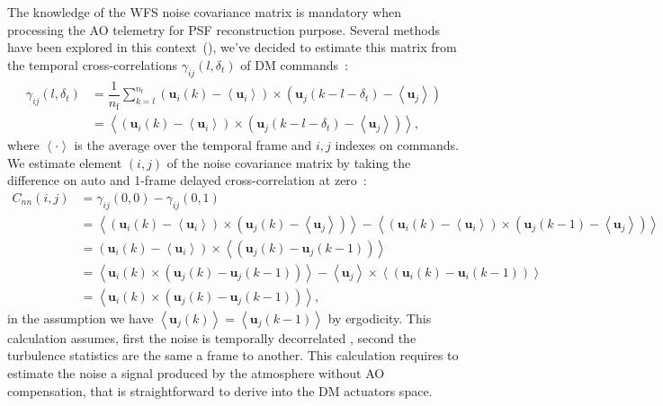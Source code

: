 \documentclass[12pt]{article}
\newcommand{\para}[1]{\left(#1\right)}
\newcommand{\aver}[1]{\left\langle #1 \right\rangle}
\begin{document}
The knowledge of the WFS noise covariance matrix is mandatory when processing the AO telemetry for PSF reconstruction purpose. Several methods have been explored in this context~(\cite{Flicker2008}), we've decided to estimate this matrix from the temporal cross-correlations $\gamma_{ij}(l,\delta_t)$ of DM commands~:
\begin{equation}
\begin{aligned}
	\gamma_{ij}(l,\delta_t) &= \dfrac{1}{n_\text{f}}\sum_{k=l}^{n_\text{f}} (\boldsymbol{u}_i(k) - \aver{\boldsymbol{u}_i})\times (\boldsymbol{u}_j(k-l-\delta_t) - \aver{\boldsymbol{u}_j}) \\
	& = \aver{(\boldsymbol{u}_i(k) - \aver{\boldsymbol{u}_i})\times (\boldsymbol{u}_j(k-l-\delta_t) - \aver{\boldsymbol{u}_j})},
\end{aligned}	
\end{equation}
where $\aver{\cdot}$ is the average over the temporal frame and $i,j$ indexes on commands. We estimate element $(i,j)$  of the noise covariance matrix by taking the difference on auto and 1-frame delayed cross-correlation at zero~: 
\begin{equation}
\begin{aligned}
	C_{nn}(i,j) &= \gamma_{ij}(0,0) - \gamma_{ij}(0,1)\\
	&= \aver{\para{\boldsymbol{u}_i(k) - \aver{\boldsymbol{u}_i}}\times \para{\boldsymbol{u}_{j}(k) - \aver{\boldsymbol{u}_j}}} - \aver{\para{\boldsymbol{u}_i(k) - \aver{\boldsymbol{u}_i}}\times \para{\boldsymbol{u}_{j}(k-1) - \aver{\boldsymbol{u}_j}}}\\
	&= \para{\boldsymbol{u}_i(k) - \aver{\boldsymbol{u}_i}} \times\aver{\para{\boldsymbol{u}_j(k) - \boldsymbol{u}_{j}(k-1)}}\\
	&=\aver{\boldsymbol{u}_i(k)\times\para{\boldsymbol{u}_j(k) - \boldsymbol{u}_{j}(k-1)}} - \aver{\boldsymbol{u}_j}\times\aver{\para{\boldsymbol{u}_i(k)- \boldsymbol{u}_{i}(k-1)}}\\
	&= \aver{\boldsymbol{u}_i(k)\times\para{\boldsymbol{u}_j(k) - \boldsymbol{u}_{j}(k-1)}},
\end{aligned}
\end{equation}
in the assumption we have $\aver{\boldsymbol{u}_{j}(k)} = \aver{\boldsymbol{u}_{j}(k-1)}$ by ergodicity. This calculation assumes, first the noise is temporally decorrelated , second the turbulence statistics are the same a frame to another. This calculation requires to estimate the noise a signal produced by the atmosphere without AO compensation, that is straightforward to derive into the DM actuators space.
\end{document}
